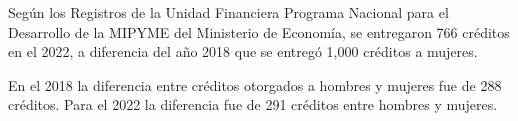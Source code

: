 Según los Registros de la Unidad Financiera Programa Nacional para el Desarrollo de la MIPYME del Ministerio de Economía, se entregaron 766 créditos en el 2022, a diferencia del año 2018 que se entregó 1,000 créditos a mujeres.

En el 2018 la diferencia entre créditos otorgados a hombres y mujeres fue de 288 créditos. Para el 2022 la diferencia fue de 291 créditos entre hombres y mujeres. 